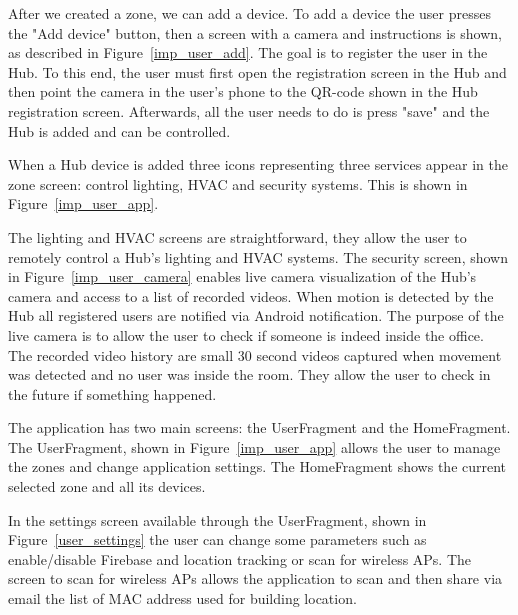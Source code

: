 After we created a zone, we can add a device. To add a device the user presses the "Add device" button, then a screen with a camera and instructions is shown, as described in Figure~\ref{imp_user_add}. The goal is to register the user in the Hub. To this end, the user must first open the registration screen in the Hub and then point the camera in the user's phone to the QR-code shown in the Hub registration screen. Afterwards, all the user needs to do is press "save" and the Hub is added and can be controlled.


When a Hub device is added three icons representing three services appear in the zone screen: control lighting, \ac{HVAC} and security systems. This is shown in Figure~\ref{imp_user_app}.

The lighting and \ac{HVAC} screens are straightforward, they allow the user to remotely control a Hub's lighting and \ac{HVAC} systems. The security screen, shown in Figure~\ref{imp_user_camera} enables live camera visualization of the Hub's camera and access to a list of recorded videos. When motion is detected by the Hub all registered users are notified via Android notification. The purpose of the live camera is to allow the user to check if someone is indeed inside the office. The recorded video history are small 30 second videos captured when movement was detected and no user was inside the room. They allow the user to check in the future if something happened.


The application has two main screens: the UserFragment and the HomeFragment. The UserFragment, shown in Figure~\ref{imp_user_app} allows the user to manage the zones and change application settings. The HomeFragment shows the current selected zone and all its devices.

In the settings screen available through the UserFragment, shown in Figure~\ref{user_settings} the user can change some parameters such as enable/disable Firebase and location tracking or scan for wireless APs. The screen to scan for wireless APs allows the application to scan and then share via email the list of \ac{MAC} address used for building location.





